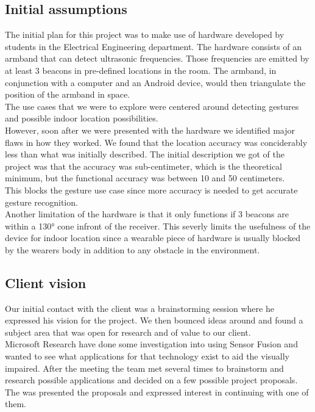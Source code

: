 \documentclass[prodmode,acmtecs]{acmsmall} %
\begin{document}
\subsection{Initial assumptions}
The initial plan for this project was to make use of hardware developed by students in the Electrical Engineering department. The hardware consists of an armband that can detect ultrasonic frequencies. Those frequencies are emitted by at least 3 beacons in pre-defined locations in the room. The armband, in conjunction with a computer and an Android device, would then triangulate the position of the armband in space.\\
The use cases that we were to explore were centered around detecting gestures and possible indoor location possibilities.\\
However, soon after we were presented with the hardware we identified major flaws in how they worked. We found that the location accuracy was conciderably less than what was initially described. The initial description we got of the project was that the accuracy was sub-centimeter, which is the theoretical minimum, but the functional accuracy was between 10 and 50 centimeters.\\
This blocks the gesture use case since more accuracy is needed to get accurate gesture recognition.\\
Another limitation of the hardware is that it only functions if 3 beacons are within a 130° cone infront of the receiver. This severly limits the usefulness of the device for indoor location since a wearable piece of hardware is usually blocked by the wearers body in addition to any obstacle in the environment.
\subsection{Client vision}
Our initial contact with the client was a brainstorming session where he expressed his vision for the project. We then bounced ideas around and found a subject area that was open for research and of value to our client.\\
Microsoft Research have done some investigation into using Sensor Fusion
and wanted to see what applications for that technology exist to aid the visually impaired.
After the meeting the team met several times to brainstorm and research possible applications and decided on a few possible project proposals.
The was presented the proposals and expressed interest in continuing with one of them.\\
\end{document}
